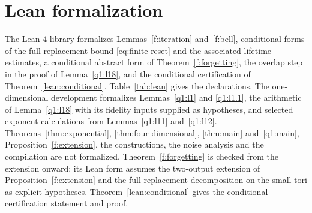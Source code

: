 \section{Lean formalization}\label{app:lean}
The Lean 4 library formalizes Lemmas~\ref{f:iteration} and~\ref{f:bell},
conditional forms of the full-replacement bound \eqref{eq:finite-reset}
and the associated lifetime estimates, a conditional abstract form of
Theorem~\ref{f:forgetting}, the overlap step in the proof of
Lemma~\ref{q1:l18}, and the conditional certification of
Theorem~\ref{lean:conditional}. Table~\ref{tab:lean} gives the declarations.
The one-dimensional development formalizes Lemmas~\ref{q1:l1} and
\ref{q1:l1.1}, the arithmetic of Lemma~\ref{q1:l18} with its fidelity
inputs supplied as hypotheses, and selected exponent calculations
from Lemmas~\ref{q1:l11} and~\ref{q1:l12}.
Theorems~\ref{thm:exponential}, \ref{thm:four-dimensional}, \ref{thm:main} and~\ref{q1:main}, Proposition~\ref{f:extension}, the constructions, the noise analysis and the compilation are not formalized. Theorem~\ref{f:forgetting} is checked from the extension onward: its Lean form assumes the two-output extension of Proposition~\ref{f:extension} and the full-replacement decomposition on the small tori as explicit hypotheses.
Theorem~\ref{lean:conditional} gives the conditional certification statement and proof.


